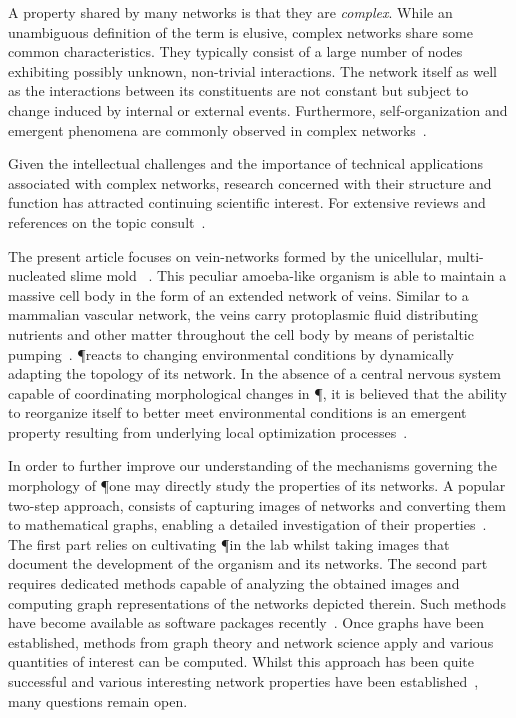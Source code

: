 	A property shared by many networks is that they are \emph{complex}. While an unambiguous definition of the term is elusive, complex networks share some common characteristics. They typically consist of a large number of nodes exhibiting possibly unknown, non-trivial interactions. The network itself as well as the interactions between its constituents are not constant but subject to change induced by internal or external events. Furthermore, self-organization and emergent phenomena are commonly observed in complex networks~\cite{barabasi1999emergence,boccaletti2006complex}.

	Given the intellectual challenges and the importance of technical applications associated with complex networks, research concerned with their structure and function has attracted continuing scientific interest. For extensive reviews and references on the topic consult~\cite{newman2003structure,boccaletti2006complex,strogatz2001exploring,amaral2004complex}.

	The present article focuses on vein-networks formed by the unicellular, multi-nucleated slime mold \Pp~\cite{lifecycle}. This peculiar amoeba-like organism is able to maintain a massive cell body in the form of an extended network of veins. Similar to a mammalian vascular network, the veins carry protoplasmic fluid distributing nutrients and other matter throughout the cell body by means of peristaltic pumping~\cite{kamiya1959motive}. \P reacts to changing environmental conditions by dynamically adapting the topology of its network. In the absence of a central nervous system capable of coordinating morphological changes in \P, it is believed that the ability to reorganize itself to better meet environmental conditions is an emergent property resulting from underlying local optimization processes~\cite{tero2010rules,nakagaki2007minimum}.

	In order to further improve our understanding of the mechanisms governing the morphology of \P one may directly study the properties of its networks. A popular two-step approach, consists of capturing images of networks and converting them to mathematical graphs, enabling a detailed investigation of their properties~\cite{baumgarten2012computational}. The first part relies on cultivating \P in the lab whilst taking images that document the development of the organism and its networks. The second part requires dedicated methods capable of analyzing the obtained images and computing graph representations of the networks depicted therein. Such methods have become available as software packages recently~\cite{dirnberger2015nefi}. Once graphs have been established, methods from graph theory and network science apply and various quantities of interest can be computed. Whilst this approach has been quite successful and various interesting network properties have been established~\cite{baumgarten2010plasmodial,baumgarten2013functional,ito2011characterization}, many questions remain open.

